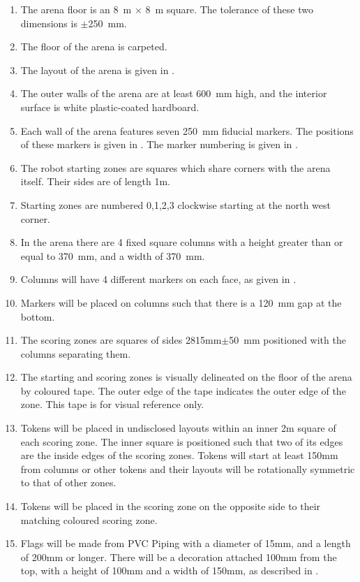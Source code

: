 \begin{enumerate}
  \item The arena floor is an \SI{8}{m} $\times$ \SI{8}{m} square. The tolerance
        of these two dimensions is $\pm$\SI{250}{mm}.
  \item The floor of the arena is carpeted.
  \item The layout of the arena is given in .
  \item The outer walls of the arena are at least \SI{600}{mm} high, and the
        interior surface is white plastic-coated hardboard.
  \item Each wall of the arena features seven \SI{250}{mm} fiducial markers.
        The positions of these markers is given in .
        The marker numbering is given in .
  \item The robot starting zones are squares which share corners with the arena
        itself. Their sides are of length \si{1}{m}.
  \item Starting zones are numbered 0,1,2,3 clockwise starting at the north west corner.
  \item In the arena there are 4 fixed square columns with a height greater than
        or equal to \SI{370}{mm}, and a width of \SI{370}{mm}.
  \item Columns will have 4 different markers on each face, as given in
        .
  \item Markers will be placed on columns such that there is a \SI{120}{mm} 
        gap at the bottom.
  \item The scoring zones are squares of sides \si{2815}{mm}$\pm$\SI{50}{mm}
        positioned with the columns separating them.
  \item The starting and scoring zones is visually delineated on the floor of
        the arena by coloured tape. The outer edge of the tape indicates the
        outer edge of the zone. This tape is for visual reference only.
  \item \label{spec:tokenpos} Tokens will be placed in undisclosed layouts
        within an inner \si{2}{m} square of each scoring zone. The inner square
        is positioned such that two of its edges are the inside edges of the
        scoring zones. Tokens will start at least \si{150}{mm} from columns
        or other tokens and their layouts will be rotationally symmetric to
        that of other zones.
  \item Tokens will be placed in the scoring zone on the opposite side to their
        matching coloured scoring zone.
  \item \label{spec:flags} Flags will be made from PVC Piping with a diameter
        of \si{15}{mm}, and a length of \si{200}{mm} or longer. There will be
        a decoration attached \si{100}{mm} from the top, with a height of \si{100}{mm}
        and a width of \si{150}{mm}, as described in .

\end{enumerate}


